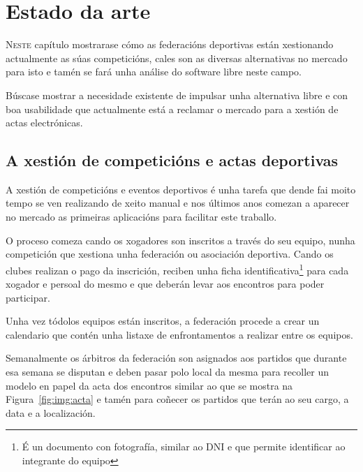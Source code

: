 \chapter{Estado da arte}
\minitoc


  \lettrine{N}{este} capítulo mostrarase cómo as federacións deportivas están 
xestionando actualmente as súas competicións, cales son as diversas 
alternativas no mercado para isto e tamén se fará unha análise do software 
libre neste campo.

  Búscase mostrar a necesidade existente de impulsar unha alternativa 
libre e con boa usabilidade que actualmente está a reclamar o mercado para a 
xestión de actas electrónicas.

  \section{A xestión de competicións e actas deportivas}
  A xestión de competicións e eventos deportivos é unha tarefa que dende fai 
moito tempo se ven realizando de xeito manual e nos últimos anos comezan a 
aparecer no mercado as primeiras aplicacións para facilitar este traballo.

  O proceso comeza cando os xogadores son inscritos a través do seu 
equipo, nunha competición que xestiona unha federación ou asociación 
deportiva. Cando os clubes realizan o pago da inscrición, reciben unha ficha 
identificativa\footnote{É un documento con fotografía, similar ao DNI e que 
permite identificar ao integrante do equipo} para cada xogador e persoal do 
mesmo e que deberán levar aos encontros para poder participar.

  Unha vez tódolos equipos están inscritos, a federación procede a crear un 
calendario que contén unha listaxe de enfrontamentos a realizar entre os 
equipos.

  Semanalmente os árbitros da federación son asignados aos partidos que durante 
esa semana se disputan e deben pasar polo local da mesma para recoller un 
modelo en papel da acta dos encontros similar ao que se mostra 
na Figura~\ref{fig:img:acta} e tamén para coñecer os partidos que terán ao 
seu cargo, a data e a localización.

